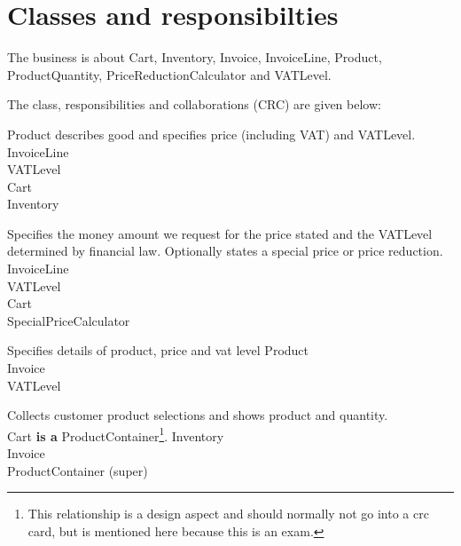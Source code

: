 \section{Classes and responsibilties}

The business is about Cart, Inventory, Invoice, InvoiceLine,
Product, ProductQuantity, PriceReductionCalculator and VATLevel.

The class, responsibilities and collaborations (CRC) are given
below:

\begin{crccard}
  {
    Product describes good and specifies
    price (including VAT) and VATLevel.
  }
  {
    InvoiceLine\\
    VATLevel\\
    Cart\\
    Inventory
  }
\end{crccard}

\begin{crccard}
  {
    Specifies the money amount we request for the price stated and the
    VATLevel determined by financial law. Optionally states a special 
    price or price reduction.
  }{
    InvoiceLine\\
    VATLevel\\
    Cart\\
    SpecialPriceCalculator
  }
\end{crccard}

\begin{crccard}
  {
    Specifies details of product, price and vat level
  }{
    Product\\
    Invoice\\
    VATLevel
  }
\end{crccard}

\begin{crccard}
  {
    Collects customer product selections and shows product and
    quantity. \\
    Cart \textbf{is a} ProductContainer\footnote{This
      relationship is a design aspect and should normally not go into
      a crc card, but is mentioned here because this is an exam.}.    
  }{
    Inventory\\
    Invoice\\
    ProductContainer (super)
  }
\end{crccard}

